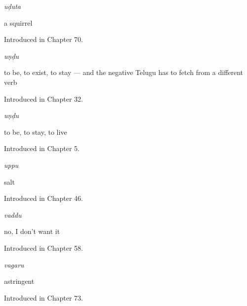 \noindent\begin{minipage}[t]{\linewidth}
\raggedright
\textbf{}\enspace\emph{uḍuta}\par
\small a squirrel\par
\footnotesize Introduced in Chapter 70.
\end{minipage}\par\medskip

\noindent\begin{minipage}[t]{\linewidth}
\raggedright
\textbf{}\enspace\emph{uṇḍu}\par
\small to be, to exist, to stay — and the negative Telugu has to fetch from a different verb\par
\footnotesize Introduced in Chapter 32.
\end{minipage}\par\medskip

\noindent\begin{minipage}[t]{\linewidth}
\raggedright
\textbf{}\enspace\emph{uṇḍu}\par
\small to be, to stay, to live\par
\footnotesize Introduced in Chapter 5.
\end{minipage}\par\medskip

\noindent\begin{minipage}[t]{\linewidth}
\raggedright
\textbf{}\enspace\emph{uppu}\par
\small salt\par
\footnotesize Introduced in Chapter 46.
\end{minipage}\par\medskip

\noindent\begin{minipage}[t]{\linewidth}
\raggedright
\textbf{}\enspace\emph{vaddu}\par
\small no, I don't want it\par
\footnotesize Introduced in Chapter 58.
\end{minipage}\par\medskip

\noindent\begin{minipage}[t]{\linewidth}
\raggedright
\textbf{}\enspace\emph{vagaru}\par
\small astringent\par
\footnotesize Introduced in Chapter 73.
\end{minipage}\par\medskip

